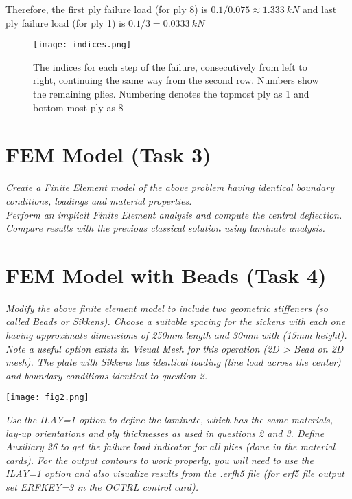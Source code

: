 \documentclass[a4paper,twosided,11pt,DIV14]{scrartcl}
\begin{document}
Therefore, the first ply failure load (for ply 8) is $0.1/0.075 \approx
\SI{1.333}{kN}$
and last ply failure load (for ply 1) is $0.1/3 = \SI{0.0333}{kN}$

\begin{figure}[H]
\begin{center}
  \texttt{[image: indices.png]}
\end{center}
\caption{The indices for each step of the failure, consecutively from left to
  right, continuing the same way from the second row. Numbers show the remaining
  plies. Numbering denotes the topmost ply as 1 and bottom-most ply as 8}
\label{fig:indices1}
\end{figure}

\section{FEM Model (Task 3)}

\textit{Create a Finite Element model of the above problem having identical
boundary conditions, loadings and material properties.
\\Perform an implicit Finite Element analysis and compute the central
deflection. Compare results with the previous classical solution using laminate
analysis.}

\section{FEM Model with Beads (Task 4)}

\textit{Modify the above finite element model to include two geometric stiffeners (so
called Beads or Sikkens). Choose a suitable spacing for the sickens with each
one having approximate dimensions of 250mm length and 30mm with (15mm height).
Note a useful option exists in Visual Mesh for this operation (2D > Bead on 2D mesh).
The plate with Sikkens has identical loading (line load across the center) and
boundary conditions identical to question 2.}

\begin{center}
  \texttt{[image: fig2.png]}
\end{center}

\textit{Use the ILAY=1 option to define the laminate, which has the same materials,
lay-up orientations and ply thicknesses as used in questions 2 and 3. Define
Auxiliary 26 to get the failure load indicator for all plies (done in the
material cards). For the output contours to work properly, you will need to use
the ILAY=1 option and also visualize results from the .erfh5 file (for erf5 file
output set ERFKEY=3 in the OCTRL control card).}
\end{document}
